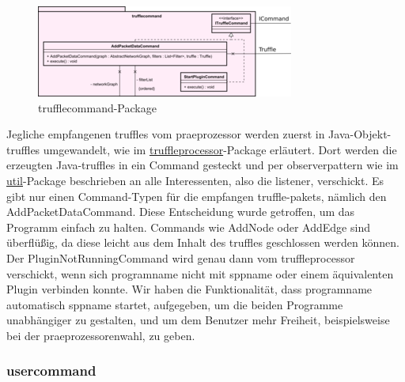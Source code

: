       \begin{figure}[H]
        \centering
        \includegraphics[width=\textwidth]{../diagramimages/trufflecommand.png}
        \caption{trufflecommand-Package}
      \end{figure}

      \medskip
      Jegliche empfangenen \glspl{truffle} vom \gls{praeprozessor} werden zuerst in Java-Objekt-\glspl{truffle} umgewandelt, wie
      im \hyperref[subsubsec:truffleprocessor]{truffleprocessor}-Package erläutert. Dort
      werden die erzeugten Java-\glspl{truffle} in ein Command gesteckt und per \gls{observerpattern}
      wie im \hyperref[subsec:util]{util}-Package beschrieben an alle Interessenten, also die \gls{listener}, verschickt.
      \newline
      \newline
      Es gibt nur einen Command-Typen für die empfangen \gls{truffle}-\glspl{paket}, nämlich den
      AddPacketDataCommand. Diese Entscheidung wurde getroffen, um das Programm einfach
      zu halten. Commands wie AddNode oder AddEdge sind überflüßig, da diese leicht aus
      dem Inhalt des \glspl{truffle} geschlossen werden können.
      \newline
      \newline
      Der PluginNotRunningCommand wird genau dann vom truffleprocessor verschickt, wenn sich \gls{programname}
      nicht mit \gls{sppname} oder einem äquivalenten Plugin verbinden konnte. Wir
      haben die Funktionalität, dass \gls{programname} automatisch \gls{sppname} startet,
      aufgegeben, um die beiden Programme unabhängiger zu gestalten, und um dem Benutzer
      mehr Freiheit, beispielsweise bei der \gls{praeprozessor}enwahl, zu geben.

      \subsubsection{usercommand}
      \label{subsubsec:usercommand}

